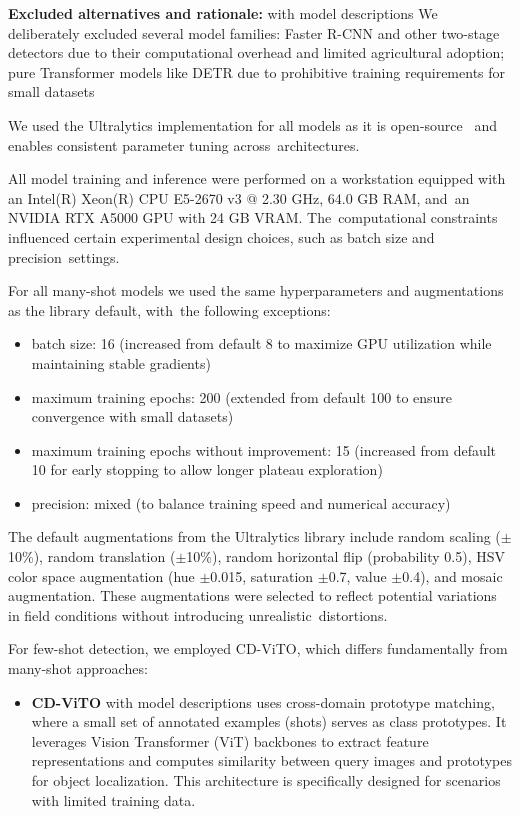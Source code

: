 \documentclass[12pt,a4paper,oneside]{report}
\begin{document}
\textbf{Excluded alternatives and rationale:} %
with model descriptions
We deliberately excluded several model families: Faster R-CNN and other two-stage 
detectors due to their computational overhead and limited agricultural adoption; 
pure Transformer models like DETR due to prohibitive training requirements for 
small datasets~\cite{carionEndtoEndObjectDetection2020} 

We used the Ultralytics implementation 
for all models as it is open-source~\cite{jocherGitHubUltralyticsYOLO2023} and 
enables consistent parameter tuning across~architectures.

All model training and inference were performed on a workstation equipped with an 
Intel(R) Xeon(R) CPU E5-2670 v3 @ 2.30 GHz, 64.0 GB RAM, and~an NVIDIA RTX A5000 
GPU with 24 GB VRAM. The~computational constraints influenced certain experimental 
design choices, such as batch size and precision~settings.

For all many-shot models we used the same hyperparameters and augmentations as the
library default, with~the following exceptions:

\begin{itemize}
  \item batch size: 16 (increased from default 8 to maximize GPU utilization while 
  maintaining stable gradients)
  \item maximum training epochs: 200 (extended from default 100 to ensure 
  convergence with small datasets)
  \item maximum training epochs without improvement: 15 (increased from default 10 
  for early stopping to allow longer plateau exploration)
  \item precision: mixed (to balance training speed and numerical accuracy)
\end{itemize}

The default augmentations from the Ultralytics library include random scaling 
($\pm$10\%), random translation ($\pm$10\%), random horizontal flip (probability 0.5), 
HSV color space augmentation (hue $\pm$0.015, saturation $\pm$0.7, value $\pm$0.4), 
and mosaic augmentation. These augmentations were selected to reflect potential 
variations in field conditions without introducing unrealistic~distortions.

For few-shot detection, we employed CD-ViTO, which differs fundamentally from 
many-shot approaches:

\begin{itemize}
  \item \textbf{CD-ViTO} %
  with model descriptions uses cross-domain prototype matching, where a small set 
  of annotated examples (shots) serves as class prototypes. It leverages Vision 
  Transformer (ViT) backbones to extract feature representations and computes 
  similarity between query images and prototypes for object localization. This 
  architecture is specifically designed for scenarios with limited training data.
\end{itemize}
\end{document}
